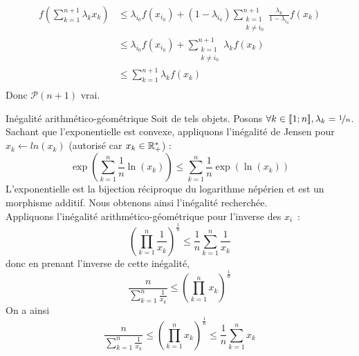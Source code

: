 \documentclass{article}
\renewenvironment{question_kholle}[2][ ]
{
	\subsection{\texorpdfstring{#2}{}}
	\notblank{#1}
	{
		\noindent #1
		\bigbreak
	}
	{}
	\begin{proof}
}
{
	\end{proof}
}
\begin{document}
\begin{question_kholle}
\begin{itemize}[label=$*$, leftmargin=0.5cm]
		      \begin{equation*}
			      \begin{aligned}
				      f\left( \sum_{k=1}^{n+1} \lambda_k x_k \right)
				       & \leqslant \lambda_{i_0} f(x_{i_0}) + \left( 1 - \lambda_{i_0} \right) \sum_{\begin{array}{c} k = 1 \\ k \neq i_0 \end{array}}^{n+1} \frac{\lambda_k}{1 - \lambda_{i_0}} f\left( x_k \right) \\
				       & \leqslant \lambda_{i_0} f(x_{i_0}) + \sum_{\begin{array}{c} k = 1 \\ k \neq i_0 \end{array}}^{n+1} \lambda_k f\left( x_k \right)                                                            \\
				       & \leqslant \sum_{k = 1}^{n+1} \lambda_k f\left( x_k \right)                                                                                                                                  \\
			      \end{aligned}
		      \end{equation*}
		      Donc $\mathcal{P}(n+1)$ vrai.
	\end{itemize}
\end{question_kholle}

\begin{question_kholle}
	[Soit $n \in \N^*$. Soient $(x_{1}, \dots, x_{n}) \in \R_+^{*n}$.
		\begin{equation}
			\left( \prod_{k=1}^{n} x_k \right)^{\nicefrac{1}{n}}
			\leqslant \frac{1}{n} \sum_{k=1}^{n} x_k
		\end{equation}]
	{Inégalité arithmético-géométrique}
	Soit de tels objets. Posons $\forall k \in [\![1;n]\!], \lambda_k = \nicefrac{1}{n}$. \\
	Sachant que l'exponentielle est convexe, appliquons l'inégalité de Jensen pour $x_k \leftarrow ln(x_k)$ (autorisé car $x_k \in \mathbb R_+^*$) :
	\begin{equation*}
		\exp \left( \sum_{k=1}^{n} \frac{1}{n} \ln \left( x_k \right) \right)
		\leqslant \sum_{k=1}^{n} \frac{1}{n} \exp \left( \ln \left( x_k \right) \right)
	\end{equation*}
	L'exponentielle est la bijection réciproque du logarithme népérien et est un morphisme additif. Nous obtenons ainsi l'inégalité recherchée.\\
	Appliquons l’inégalité arithmético-géométrique pour l’inverse des $x_{i}$~:
	\[
		\left(\prod_{k=1}^{n} \frac{1}{x_{k}}\right)^{\frac{1}{n}} \leq \frac{1}{n} \sum_{k=1}^{n}\frac{1}{x_{k}}
	\]
	donc en prenant l’inverse de cette inégalité,
	\[
		\frac{n}{\displaystyle\sum_{k=1}^{n}\frac{1}{x_{k}}} \leq \left(\prod_{k=1}^{n}x_{k}\right)^{\frac{1}{n}}
	\]
	On a ainsi
	\[
		\frac{n}{\displaystyle\sum_{k=1}^{n}\frac{1}{x_{k}}} \leq \left(\prod_{k=1}^{n}x_{k}\right)^{\frac{1}{n}} \leq \frac{1}{n}\sum_{k=1}^{n}x_{k}
	\]
\end{question_kholle}
\end{document}
